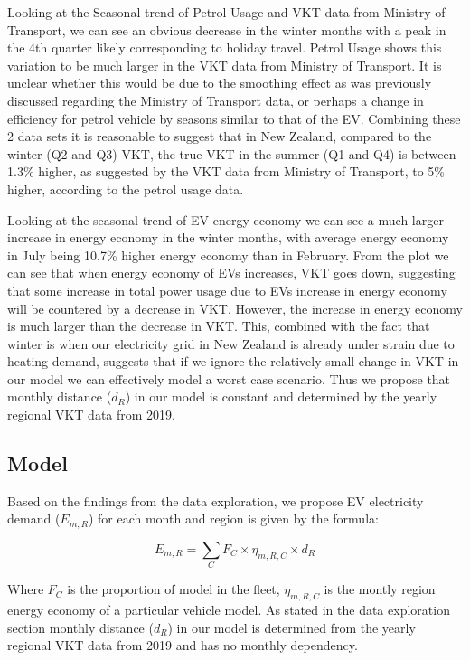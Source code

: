 \documentclass[
]{article}
\begin{document}
Looking at the Seasonal trend of Petrol Usage and VKT data from Ministry
of Transport, we can see an obvious decrease in the winter months with a
peak in the 4th quarter likely corresponding to holiday travel. Petrol
Usage shows this variation to be much larger in the VKT data from
Ministry of Transport. It is unclear whether this would be due to the
smoothing effect as was previously discussed regarding the Ministry of
Transport data, or perhaps a change in efficiency for petrol vehicle by
seasons similar to that of the EV. Combining these 2 data sets it is
reasonable to suggest that in New Zealand, compared to the winter (Q2
and Q3) VKT, the true VKT in the summer (Q1 and Q4) is between 1.3\%
higher, as suggested by the VKT data from Ministry of Transport, to 5\%
higher, according to the petrol usage data.

Looking at the seasonal trend of EV energy economy we can see a much
larger increase in energy economy in the winter months, with average
energy economy in July being 10.7\% higher energy economy than in
February. From the plot we can see that when energy economy of EVs
increases, VKT goes down, suggesting that some increase in total power
usage due to EVs increase in energy economy will be countered by a
decrease in VKT. However, the increase in energy economy is much larger
than the decrease in VKT. This, combined with the fact that winter is
when our electricity grid in New Zealand is already under strain due to
heating demand, suggests that if we ignore the relatively small change
in VKT in our model we can effectively model a worst case scenario. Thus
we propose that monthly distance (\(d_{R}\)) in our model is constant
and determined by the yearly regional VKT data from 2019.

\hypertarget{model}{%
\subsection{Model}\label{model}}

Based on the findings from the data exploration, we propose EV
electricity demand (\(E_{m,R}\)) for each month and region is given by
the formula:

\begin{equation}
\label{eq:energy_usage}
E_{m,R} = \sum_{C} F_C \times \eta_{m,R,C} \times d_{R}
\end{equation}

Where \(F_C\) is the proportion of model in the fleet, \(\eta_{m,R,C}\)
is the montly region energy economy of a particular vehicle model. As
stated in the data exploration section monthly distance (\(d_{R}\)) in
our model is determined from the yearly regional VKT data from 2019 and
has no monthly dependency.
\end{document}
